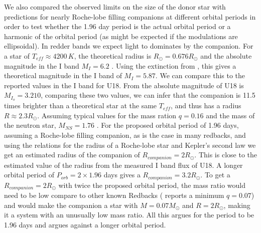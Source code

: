\documentclass[fleqn,usenatbib,useAMS,letters]{mnras}
\begin{document}
 
 We also compared the observed limits on the size of the donor star with predictions for nearly Roche-lobe filling companions at different orbital periods in order to test whether the 1.96 day period is the actual orbital period or a harmonic of the orbital period (as might be expected if the modulations are ellipsoidal). In redder bands we expect light to dominates by the companion. For a star of $T_{eff} \approx 4200 \, K$, the theoretical radius is $R_\odot = 0.676 R_\odot$ and the absolute magnitude in the I band  $M_{I} = 6.2$ \citep{Mamajek2013}. Using the extinction from \cite{Richer2008}, this gives a theoretical magnitude in the I band of $M_I = 5.87$. We can compare this to the reported values in the I band for U18. From \cite{Pallanca2017Halpha} the absolute magnitude of U18 is  $M_{I_o} = 3.210$, comparing these two values, we can infer that the companion is 11.5 times brighter than a theoretical star at the same $T_{eff}$, and thus has a radius $R \approx 2.3 R_\odot$. Assuming typical values for the mass ration $q=0.16$ and the mass of the neutron star, $M_{NS}=1.76$ \citep{Strader2019Redbacks}. For the proposed orbital period of 1.96 days, assuming a Roche-lobe filling companion, as is the case in many redbacks, and using the \cite{Paczy1971} relations for the radius of a Roche-lobe star and Kepler's second law we get an estimated radius of the companion of $R_{companion} = 2 R_\odot$. This is close to the estimated value of the radius from the measured I band flux of U18. A longer orbital period of $P_{orb}=2\times 1.96$ days gives a $R_{companion} = 3.2 R_{\odot}$. To get a $R_{companion} = 2 R_\odot$ with twice the proposed orbital period, the mass ratio would need to be low compare to other known Redbacks (\cite{Strader2019Redbacks} reports a minimum $q= 0.07$) and would make the companion a star with $M =0.07 M_\odot$ and $R= 2 R_\odot$, making it a system with an unusually low mass ratio. All this argues for the period to be 1.96 days and argues against a longer orbital period. 
 
 
 
 
 
 
\end{document}
